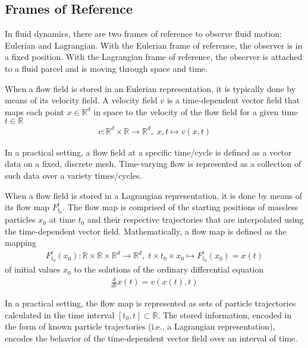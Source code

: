 
\subsection{Frames of Reference}
%
In fluid dynamics, there are two frames of reference to observe fluid motion: Eulerian and Lagrangian.
%
With the Eulerian frame of reference, the observer is in a fixed position.
%
With the Lagrangian frame of reference, the observer is attached to a fluid parcel and is moving through space and time.

%
When a flow field is stored in an Eulerian representation, it is typically done by means of its velocity field.
%
A velocity field $v$ is a time-dependent vector field that maps each point $x\in \mathbb R^d$ in space to the velocity of the flow field for a given time $t\in \mathbb R$
%
\begin{eqnarray}
{v} : \mathbb R^d \times \mathbb R \to \mathbb R^d,\; x,t \mapsto v(x,t)
\end{eqnarray}

%
In a practical setting, a flow field at a specific time/cycle is defined as a vector data on a fixed, discrete mesh.
%
Time-varying flow is represented as a collection of such data over a variety times/cycles.


When a flow field is stored in a Lagrangian representation, it is done by means of its flow map $F_{t_0}^{t}$.
%
The flow map is comprised of the starting positions of massless particles $x_0$ at time $t_0$ and their respective trajectories that are interpolated using the time-dependent vector field.
%
Mathematically, a flow map is defined as the mapping
\begin{eqnarray}
F_{t_0}^{t}(x_0):\mathbb R \times \mathbb R \times \mathbb R^d \to \mathbb R^d,\; t \times t_0 \times x_0 \mapsto F_{t_0}^{t}(x_0) = x(t)
\end{eqnarray}
%
of initial values $x_0$ to the solutions of the ordinary differential equation
%
\begin{eqnarray}
\frac{d}{dt}x(t) = v(x(t),t)
\end{eqnarray}

In a practical setting, the flow map is represented as sets of particle trajectories calculated in the time interval $[t_0,t]\subset \mathbb R$.
%
The stored information, encoded in the form of known particle trajectories (i.e., a Lagrangian representation), encodes the behavior of the time-dependent vector field over an interval of time.
%
%
%
%


